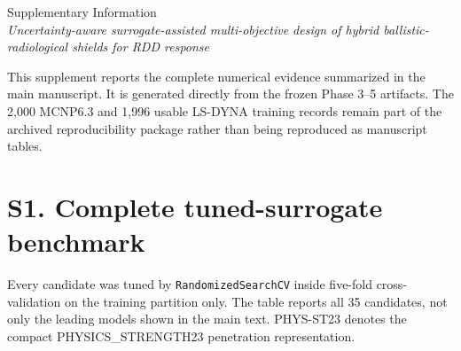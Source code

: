 \documentclass[11pt]{article}
\begin{document}
\begin{center}
{\Large Supplementary Information}\\[0.4em]
\textit{Uncertainty-aware surrogate-assisted multi-objective design of hybrid ballistic-radiological shields for RDD response}
\end{center}
\noindent This supplement reports the complete numerical evidence summarized in the main manuscript. It is generated directly from the frozen Phase 3--5 artifacts. The 2,000 MCNP6.3 and 1,996 usable LS-DYNA training records remain part of the archived reproducibility package rather than being reproduced as manuscript tables.

\section*{S1. Complete tuned-surrogate benchmark}
Every candidate was tuned by \texttt{RandomizedSearchCV} inside five-fold cross-validation on the training partition only. The table reports all 35 candidates, not only the leading models shown in the main text. PHYS-ST23 denotes the compact PHYSICS\_STRENGTH23 penetration representation.
\end{document}
